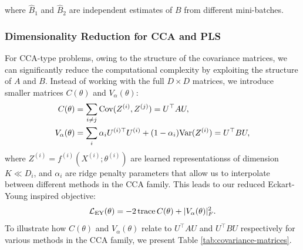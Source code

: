 where $\hat{B}_1$ and $\hat{B}_2$ are independent estimates of $B$ from different mini-batches.

\subsubsection{Dimensionality Reduction for CCA and PLS}\label{sec:dim-reduction}
For CCA-type problems, owing  to the structure  of the covariance matrices, we can significantly reduce the computational complexity by exploiting the structure of $A$ and $B$. Instead of working with the full $D \times D$ matrices, we introduce smaller matrices $C(\theta)$ and $V_\alpha(\theta)$:
\begin{align}\label{eq:def-C-V-matrices}
C(\theta) &= \sum_{i \neq j} \mathrm{Cov}(Z^{(i)}, Z^{(j)}) = U^\top A U, \\
V_\alpha(\theta) &= \sum_i \alpha_i U^{(i)\top} U^{(i)} + (1 - \alpha_i) \mathrm{Var}(Z^{(i)}) = U^\top B U,
\end{align}
where $Z^{(i)} = f^{(i)}(X^{(i)}; \theta^{(i)})$ are learned \glspl{representations} of dimension $K \ll D_i$, and $\alpha_i$ are ridge penalty parameters that allow us to interpolate between different methods in the CCA family.
This leads to our reduced Eckart-Young inspired objective:
\begin{align}\label{eq:EY-loss-def-C-V}
\mathcal{L}_\text{EY}(\theta) = -2 \operatorname{trace} C(\theta) + |V_\alpha(\theta)|_F^2.
\end{align}
To illustrate how $C(\theta)$ and $V_\alpha(\theta)$ relate to $U^\top A U$ and $U^\top B U$ respectively for various methods in the CCA family, we present Table \ref{tab:covariance-matrices}.
